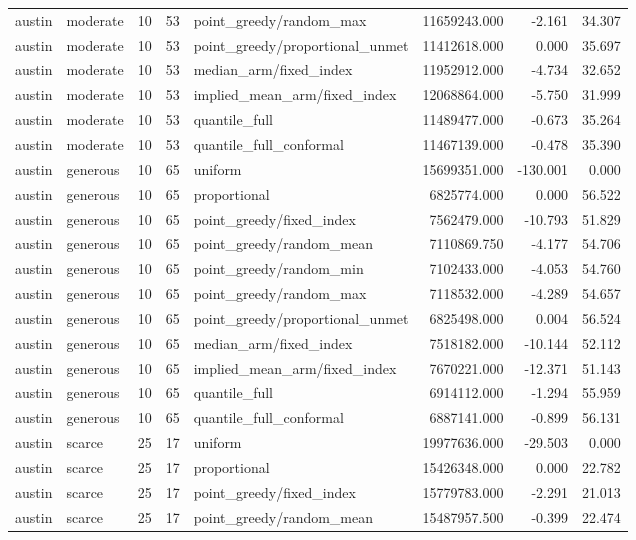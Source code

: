 \begin{tabular}{llrrlrrr}
austin & moderate & 10 & 53 & point\_greedy/random\_max & 11659243.000 & -2.161 & 34.307 \\
austin & moderate & 10 & 53 & point\_greedy/proportional\_unmet & 11412618.000 & 0.000 & 35.697 \\
austin & moderate & 10 & 53 & median\_arm/fixed\_index & 11952912.000 & -4.734 & 32.652 \\
austin & moderate & 10 & 53 & implied\_mean\_arm/fixed\_index & 12068864.000 & -5.750 & 31.999 \\
austin & moderate & 10 & 53 & quantile\_full & 11489477.000 & -0.673 & 35.264 \\
austin & moderate & 10 & 53 & quantile\_full\_conformal & 11467139.000 & -0.478 & 35.390 \\
austin & generous & 10 & 65 & uniform & 15699351.000 & -130.001 & 0.000 \\
austin & generous & 10 & 65 & proportional & 6825774.000 & 0.000 & 56.522 \\
austin & generous & 10 & 65 & point\_greedy/fixed\_index & 7562479.000 & -10.793 & 51.829 \\
austin & generous & 10 & 65 & point\_greedy/random\_mean & 7110869.750 & -4.177 & 54.706 \\
austin & generous & 10 & 65 & point\_greedy/random\_min & 7102433.000 & -4.053 & 54.760 \\
austin & generous & 10 & 65 & point\_greedy/random\_max & 7118532.000 & -4.289 & 54.657 \\
austin & generous & 10 & 65 & point\_greedy/proportional\_unmet & 6825498.000 & 0.004 & 56.524 \\
austin & generous & 10 & 65 & median\_arm/fixed\_index & 7518182.000 & -10.144 & 52.112 \\
austin & generous & 10 & 65 & implied\_mean\_arm/fixed\_index & 7670221.000 & -12.371 & 51.143 \\
austin & generous & 10 & 65 & quantile\_full & 6914112.000 & -1.294 & 55.959 \\
austin & generous & 10 & 65 & quantile\_full\_conformal & 6887141.000 & -0.899 & 56.131 \\
austin & scarce & 25 & 17 & uniform & 19977636.000 & -29.503 & 0.000 \\
austin & scarce & 25 & 17 & proportional & 15426348.000 & 0.000 & 22.782 \\
austin & scarce & 25 & 17 & point\_greedy/fixed\_index & 15779783.000 & -2.291 & 21.013 \\
austin & scarce & 25 & 17 & point\_greedy/random\_mean & 15487957.500 & -0.399 & 22.474 \\

\end{tabular}
